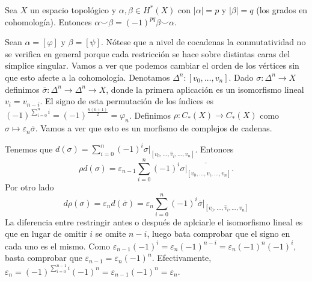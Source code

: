 \documentclass[TA.tex]{subfiles}
\begin{document}
\begin{teorema}
Sea $X$ un espacio topológico y $\alpha,\beta\in H^*(X)$ con $|\alpha|=p$ y $|\beta|=q$ (los grados en cohomología). Entonces $\alpha\smile \beta=(-1)^{pq}\beta\smile\alpha$. 
\end{teorema}
\begin{dem}
Sean $\alpha=[\varphi]$ y $\beta=[\psi]$. Nótese que a nivel de cocadenas la conmutatividad no se verifica en general porque cada restricción se hace sobre distintas caras del símplice singular. Vamos a ver que podemos cambiar el orden de los vértices sin que esto afecte a la cohomología. Denotamos $\Delta^n:[v_0,\dots, v_n]$. Dado $\sigma:\Delta^n\to X$ definimos $\overline{\sigma}:\Delta^n\to\Delta^n\to X$, donde la primera aplicación es un isomorfismo lineal $v_i=v_{n-i}$. El signo de esta permutación de los índices es $(-1)^{\sum_{i=0}^ni}=(-1)^{\frac{n(n+1)}{2}}=\varphi_n$. Definimos $\rho:C_*(X)\to C_*(X)$ como $\sigma\mapsto\varepsilon_n\overline{\sigma}$. Vamos a ver que esto es un morfismo de complejos de cadenas. 

Tenemos que $d(\sigma)=\sum_{i=0}^n(-1)^i\sigma|_{[v_0,\dots, \hat{v}_i,\dots, v_n]}$. Entonces 
\[
\rho d(\sigma)=\varepsilon_{n-1}\sum_{i=0}^n(-1)^i\overline{\sigma|_{[v_0,\dots, \hat{v}_i,\dots, v_n]}}.
\]
Por otro lado
\[
d\rho(\sigma)=\varepsilon_nd(\overline{\sigma})=\varepsilon_n\sum_{i=0}^n(-1)^i\overline{\sigma}|_{[v_0,\dots, \hat{v}_i,\dots, v_n]}
\]
La diferencia entre restringir antes o después de aplciarle el isomorfismo lineal es que en lugar de omitir $i$ se omite $n-i$, luego bata comprobar que el signo en cada uno es el mismo. Como $\varepsilon_{n-1}(-1)^i=\varepsilon_n(-1)^{n-i}=\varepsilon_n(-1)^n(-1)^i$, basta comprobar que $\varepsilon_{n-1}=\varepsilon_n(-1)^n$. Efectivamente, $\varepsilon_n=(-1)^{\sum_{i=0}^{n-1}i}(-1)^n=\varepsilon_{n-1}(-1)^n=\varepsilon_n$. 


\end{dem}
\end{document}
